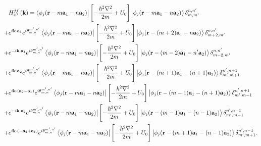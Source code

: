\documentclass{report}
\begin{document}
\begin{equation}
	\begin{aligned}
		  & H_{ii'}^{jj'}(\mathbf{k})
		= \bra{\phi_{j}(\mathbf{r} -  m \mathbf{a}_{1} - n\mathbf{a}_{2})} \left[-\frac{\hbar^{2}\nabla^{2}}{2m} + U_{0}\right] \ket{\phi_{j}(\mathbf{r} -  m \mathbf{a}_{1} - n\mathbf{a}_{2})} \delta_{m,m'}^{n,n'}                                                                                                \\
		+ & e^{i\mathbf{k}\cdot\mathbf{a}_{1}} e^{i\theta_{m,n}^{m',n'}} \bra{\phi_{j}(\mathbf{r} - m \mathbf{a}_{1} - n\mathbf{a}_{2})} \left[-\frac{\hbar^{2}\nabla^{2}}{2m} + U_{0}\right] \ket{\phi_{j}(\mathbf{r} - (m+2) \mathbf{a}_{1} - n\mathbf{a}_{2})} \delta_{m+2,m'}^{n,n'}                             \\
		+ & e^{-i\mathbf{k}\cdot\mathbf{a}_{1}} e^{i\theta_{m,n}^{m',n'}} \bra{\phi_{j}(\mathbf{r} - m \mathbf{a}_{1} - n\mathbf{a}_{2})} \left[-\frac{\hbar^{2}\nabla^{2}}{2m} + U_{0}\right] \ket{\phi_{j}(\mathbf{r} - (m-2) \mathbf{a}_{1} - n'\mathbf{a}_{2})} \delta_{m-2,m'}^{n,n'}                           \\
		+ & e^{i\mathbf{k}\cdot\mathbf{a}_{2}} e^{i\theta_{m,n}^{m',n'}} \bra{\phi_{j}(\mathbf{r} - m \mathbf{a}_{1} - n\mathbf{a}_{2})} \left[-\frac{\hbar^{2}\nabla^{2}}{2m} + U_{0}\right] \ket{\phi_{j}(\mathbf{r} - (m+1) \mathbf{a}_{1} - (n+1)\mathbf{a}_{2})} \delta_{m',m+1}^{n',n+1}                       \\
		+ & e^{i\mathbf{k}\cdot(\mathbf{a}_{2} - \mathbf{a}_{1})} e^{i\theta_{m,n}^{m',n'}} \bra{\phi_{j}(\mathbf{r} - m \mathbf{a}_{1} - n\mathbf{a}_{2})} \left[-\frac{\hbar^{2}\nabla^{2}}{2m} + U_{0}\right] \ket{\phi_{j}(\mathbf{r} - (m-1) \mathbf{a}_{1} - (n+1)\mathbf{a}_{2})} \delta_{m',m-1}^{n',n+1}    \\
		+ & e^{-i\mathbf{k}\cdot\mathbf{a}_{2}} e^{i\theta_{m,n}^{m',n'}} \bra{\phi_{j}(\mathbf{r} - m \mathbf{a}_{1} - n\mathbf{a}_{2})} \left[-\frac{\hbar^{2}\nabla^{2}}{2m} + U_{0}\right] \ket{\phi_{j}(\mathbf{r} - (m-1) \mathbf{a}_{1} - (n-1)\mathbf{a}_{2})} \delta_{m',m-1}^{n',n-1}                      \\
		+ & e^{i\mathbf{k}\cdot(-\mathbf{a}_{2} + \mathbf{a}_{1})} e^{i\theta_{m,n}^{m',n'}} \bra{\phi_{j}(\mathbf{r} - m \mathbf{a}_{1} - n\mathbf{a}_{2})} \left[-\frac{\hbar^{2}\nabla^{2}}{2m} + U_{0}\right] \ket{\phi_{j}(\mathbf{r} - (m+1) \mathbf{a}_{1} - (n-1)\mathbf{a}_{2})} \delta_{m',m+1}^{n',n-1} . \\
	\end{aligned}
\end{equation}
\end{document}
